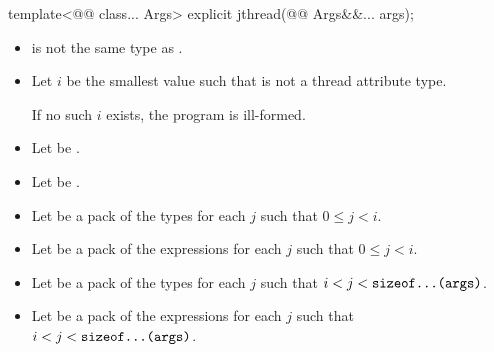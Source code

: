 \documentclass{wg21}
\begin{document}
%
\begin{itemdecl}
template<@@ class... Args>
explicit jthread(@@ Args&&... args);\end{itemdecl}\begin{itemdescr}\begin{itemize}
\item {} is not the same type as .
\end{itemize}

\begin{addedblock}
\begin{itemize}[leftmargin=*]
\item Let $i$ be the smallest value such that  is not a thread attribute type.

If no such $i$ exists, the program is ill-formed.

\item Let  be .
\item Let  be .
\item Let  be a pack of the types  for each $j$ such that $ 0 \leq j < i $.
\item Let  be a pack of the expressions  for each $j$ such that $ 0 \leq j < i $.
\item Let  be a pack of the types  for each $j$ such that $ i < j <  \texttt{sizeof...(args)}$.
\item Let  be a pack of the expressions  for each $j$ such that $ i < j < \texttt{sizeof...(args)}$.
\end{itemize}
\end{addedblock}


\end{itemdescr}
\end{document}
